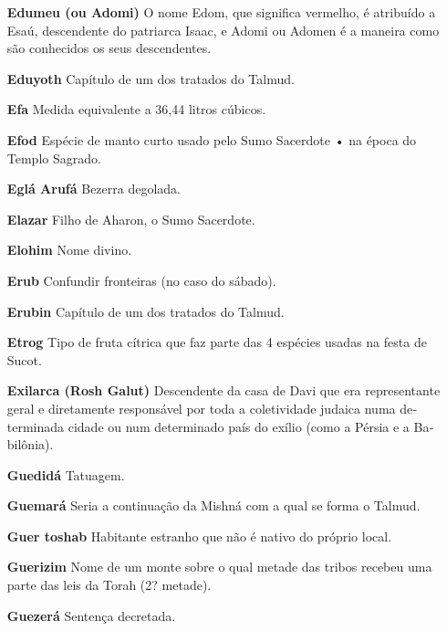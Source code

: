 \begin{itemize}
\item[\textbf{Edumeu (ou Adomi)}] O nome
Edom, que significa vermelho, é atri­buído a Esaú, descendente do
patriar­ca Isaac, e Adomi ou Adomen é a ma­neira como são conhecidos os
seus descendentes.

\item[\textbf{Eduyoth}] Capítulo de um dos trata­dos do Talmud.

\item[\textbf{Efa}] Medida equivalente a 36,44 litros cúbicos.

\item[\textbf{Efod}] Espécie de manto curto usado pelo Sumo Sacerdote • na
época do Templo Sagrado.

\item[\textbf{Eglá Arufá}] Bezerra degolada.

\item[\textbf{Elazar}] Filho de Aharon, o Sumo Sa­cerdote.

\item[\textbf{Elohim}] Nome divino.

\item[\textbf{Erub}] Confundir fronteiras (no caso do sábado).

\item[\textbf{Erubin}] Capítulo de um dos tratados do Talmud.

\item[\textbf{Etrog}] Tipo de fruta cítrica que faz parte das 4 espécies
usadas na festa de Sucot.

\item[\textbf{Exilarca (Rosh Galut)}] Descenden­te da casa de Davi que era
representan­te geral e diretamente responsável por toda a coletividade
judaica numa de­terminada cidade ou num determina­do país do exílio
(como a Pérsia e a Ba­bilônia).

\item[\textbf{Guedidá}] Tatuagem.

\item[\textbf{Guemará}] Seria a continuação da Mishná com a qual se forma o
Talmud.

\item[\textbf{Guer toshab}] Habitante estranho que não é nativo do
próprio local.

\item[\textbf{Guerizim}] Nome de um monte sobre
o qual metade das tribos recebeu uma parte das leis da Torah (2?
metade).

\item[\textbf{Guezerá}] Sentença decretada.


\end{itemize}
